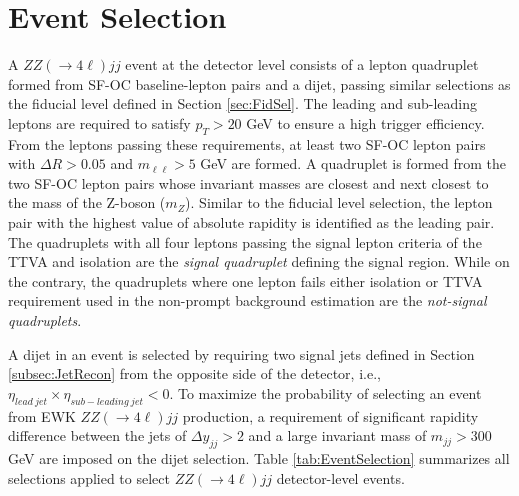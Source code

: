 \section{Event Selection}
\label{sec:EventSel}

A $ZZ (\rightarrow 4\ell) jj$ event at the detector level consists of a lepton quadruplet formed from SF-OC baseline-lepton pairs and a dijet, passing similar selections as the fiducial level defined in Section \ref{sec:FidSel}. The leading and sub-leading leptons are required to satisfy $p_{T} > 20$ GeV to ensure a high trigger efficiency. From the leptons passing these requirements, at least two SF-OC lepton pairs with $\Delta R > 0.05$ and $m_{\ell\ell} > 5$ GeV are formed. A quadruplet is formed from the two SF-OC lepton pairs whose invariant masses are closest and next closest to the mass of the Z-boson ($m_{Z}$). Similar to the fiducial level selection, the lepton pair with the highest value of absolute rapidity is identified as the leading pair. The quadruplets with all four leptons passing the signal lepton criteria of the TTVA and isolation are the \textit{signal quadruplet} defining the signal region. While on the contrary, the quadruplets where one lepton fails either isolation or TTVA requirement used in the non-prompt background estimation are the \textit{not-signal quadruplets}. 

A dijet in an event is selected by requiring two signal jets defined in Section \ref{subsec:JetRecon} from the opposite side of the detector, i.e., $\eta_{lead~jet} \times \eta_{sub-leading~jet} < 0$. To maximize the probability of selecting an event from EWK $ZZ(\rightarrow 4\ell)jj$ production, a requirement of significant rapidity difference between the jets of $\Delta y_{jj}> 2 $ and a large invariant mass of $m_{jj} > 300 $ GeV are imposed on the dijet selection. Table \ref{tab:EventSelection} summarizes all selections applied to select $ZZ(\rightarrow 4\ell)jj$ detector-level events.

